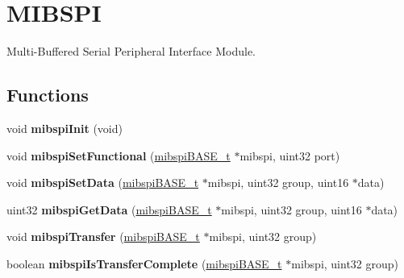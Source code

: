 \hypertarget{group__MIBSPI}{}\section{M\+I\+B\+S\+PI}
\label{group__MIBSPI}


Multi-\/\+Buffered Serial Peripheral Interface Module.  


\subsection*{Functions}
\begin{DoxyCompactItemize}
\item 
\mbox{\label{group__MIBSPI_ga20200787a0780b382c5b2df36c01baa0}} 
void {\bfseries mibspi\+Init} (void)
\item 
\mbox{\label{group__MIBSPI_gafee4245ce44107234f8cd8df7238f84a}} 
void {\bfseries mibspi\+Set\+Functional} (\mbox{\hyperlink{reg__mibspi_8h_a76bb471ca1dd17f94e340cca80dab5e6}{mibspi\+B\+A\+S\+E\+\_\+t}} $\ast$mibspi, uint32 port)
\item 
\mbox{\label{group__MIBSPI_gaeeefb6348a13cc2cb9ca94358bd7dc1e}} 
void {\bfseries mibspi\+Set\+Data} (\mbox{\hyperlink{reg__mibspi_8h_a76bb471ca1dd17f94e340cca80dab5e6}{mibspi\+B\+A\+S\+E\+\_\+t}} $\ast$mibspi, uint32 group, uint16 $\ast$data)
\item 
\mbox{\label{group__MIBSPI_gad0e6627b793fdf98379a8882c3ba51db}} 
uint32 {\bfseries mibspi\+Get\+Data} (\mbox{\hyperlink{reg__mibspi_8h_a76bb471ca1dd17f94e340cca80dab5e6}{mibspi\+B\+A\+S\+E\+\_\+t}} $\ast$mibspi, uint32 group, uint16 $\ast$data)
\item 
\mbox{\label{group__MIBSPI_ga1b7e7994b97f4091a98e5f3e1a01daca}} 
void {\bfseries mibspi\+Transfer} (\mbox{\hyperlink{reg__mibspi_8h_a76bb471ca1dd17f94e340cca80dab5e6}{mibspi\+B\+A\+S\+E\+\_\+t}} $\ast$mibspi, uint32 group)
\item 
\mbox{\label{group__MIBSPI_ga8f3767bfccce97a2337c345437f75e0d}} 
boolean {\bfseries mibspi\+Is\+Transfer\+Complete} (\mbox{\hyperlink{reg__mibspi_8h_a76bb471ca1dd17f94e340cca80dab5e6}{mibspi\+B\+A\+S\+E\+\_\+t}} $\ast$mibspi, uint32 group)

\end{DoxyCompactItemize}
